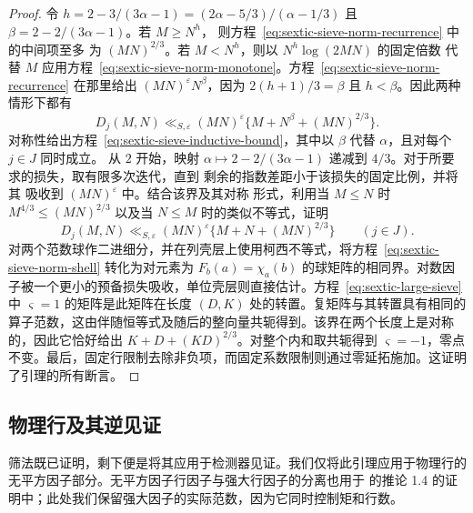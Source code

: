 \documentclass[11pt,a4paper]{article}
\numberwithin{equation}{section}
\numberwithin{figure}{section}
\theoremstyle{definition}
\theoremstyle{remark}
\begin{document}
\begin{proof}
令 $h=2-3/(3\alpha-1)=(2\alpha-5/3)/(\alpha-1/3)$ 且
$\beta=2-2/(3\alpha-1)$。若 $M\ge N^h$，
则方程~\eqref{eq:sextic-sieve-norm-recurrence} 中的中间项至多
为 $(MN)^{2/3}$。若 $M<N^h$，则以 $N^h\log(2MN)$ 的固定倍数
代替 $M$ 应用方程~\eqref{eq:sextic-sieve-norm-monotone}。方程~\eqref{eq:sextic-sieve-norm-recurrence}
在那里给出 $(MN)^\varepsilon N^\beta$，因为
$2(h+1)/3=\beta$ 且 $h<\beta$。因此两种情形下都有
\[
 D_j(M,N)\ll_{S,\varepsilon}(MN)^\varepsilon
                   \{M+N^\beta+(MN)^{2/3}\}.
\]
对称性给出方程~\eqref{eq:sextic-sieve-inductive-bound}，其中以
$\beta$ 代替 $\alpha$，且对每个 $j\in J$ 同时成立。
从 $2$ 开始，映射 $\alpha\mapsto2-2/(3\alpha-1)$ 递减到
$4/3$。对于所要求的损失，取有限多次迭代，直到
剩余的指数差距小于该损失的固定比例，并将其
吸收到 $(MN)^\varepsilon$ 中。结合该界及其对称
形式，利用当 $M\le N$ 时
$M^{4/3}\le(MN)^{2/3}$ 以及当
$N\le M$ 时的类似不等式，证明
\begin{equation}\label{eq:sextic-sieve-norm-shell}
 D_j(M,N)\ll_{S,\varepsilon}(MN)^\varepsilon
               \{M+N+(MN)^{2/3}\}\qquad(j\in J).
\end{equation}对两个范数球作二进细分，并在列壳层上使用柯西不等式，将方程~\eqref{eq:sextic-sieve-norm-shell} 转化为对元素为 $F_b(a)=\chi_a(b)$ 的球矩阵的相同界。对数因子被一个更小的预备损失吸收，单位壳层则直接估计。方程~\eqref{eq:sextic-large-sieve} 中 $\varsigma=1$ 的矩阵是此矩阵在长度 $(D,K)$ 处的转置。复矩阵与其转置具有相同的算子范数，这由伴随恒等式及随后的整向量共轭得到。该界在两个长度上是对称的，因此它恰好给出 $K+D+(KD)^{2/3}$。对整个内和取共轭得到 $\varsigma=-1$，零点不变。最后，固定行限制去除非负项，而固定系数限制则通过零延拓施加。这证明了引理的所有断言。
\end{proof}

\subsection{物理行及其逆见证}

筛法既已证明，剩下便是将其应用于检测器见证。我们仅将此引理应用于物理行的无平方因子部分。无平方因子行因子与强大行因子的分离也用于 \cite{BGL} 的推论 1.4 的证明中；此处我们保留强大因子的实际范数，因为它同时控制矩和行数。
\end{document}
